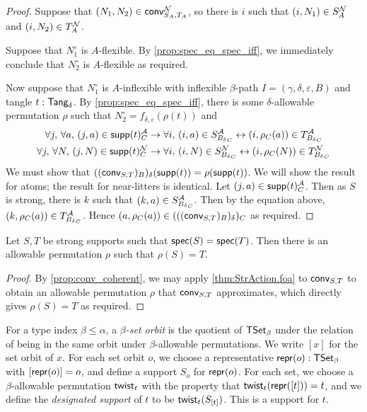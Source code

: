 \begin{proof}
  Suppose that \( (N_1, N_2) \in \operatorname{\mathsf{conv}}_{S_A,T_A}^{\mathcal N} \), so there is \( i \) such that \( (i, N_1) \in S_A^{\mathcal N} \) and \( (i, N_2) \in T_A^{\mathcal N} \).

  Suppose that \( N_1^\circ \) is \( A \)-flexible.
  By \cref{prop:spec_eq_spec_iff}, we immediately conclude that \( N_2^\circ \) is \( A \)-flexible as required.

  Now suppose that \( N_1^\circ \) is \( A \)-inflexible with inflexible \( \beta \)-path \( I = (\gamma,\delta,\varepsilon,B) \) and tangle \( t : \mathsf{Tang}_\delta \).
  By \cref{prop:spec_eq_spec_iff}, there is some \( \delta \)-allowable permutation \( \rho \) such that \( N_2^\circ = f_{\delta,\varepsilon}(\rho(t)) \) and
  \begin{align*}
    \forall j,\, \forall a,\, (j, a) \in \operatorname{\mathsf{supp}}(t)_C^{\mathcal A} &\to \forall i,\, (i, a) \in S_{{B_\delta}_C}^{\mathcal A} \leftrightarrow (i, \rho_C(a)) \in T_{{B_\delta}_C}^{\mathcal A} \\
    \forall j,\, \forall N,\, (j, N) \in \operatorname{\mathsf{supp}}(t)_C^{\mathcal N} &\to \forall i,\, (i, N) \in S_{{B_\delta}_C}^{\mathcal N} \leftrightarrow (i, \rho_C(N)) \in T_{{B_\delta}_C}^{\mathcal N}
  \end{align*}
  We must show that \( ((\operatorname{\mathsf{conv}}_{S,T})_B)_\delta(\operatorname{\mathsf{supp}}(t)) = \rho(\operatorname{\mathsf{supp}}(t)) \).
  We will show the result for atoms; the result for near-litters is identical.
  Let \( (j, a) \in \operatorname{\mathsf{supp}}(t)_C^{\mathcal A} \).
  Then as \( S \) is strong, there is \( k \) such that \( (k, a) \in S_{{B_\delta}_C}^{\mathcal A} \).
  Then by the equation above, \( (k, \rho_C(a)) \in T_{{B_\delta}_C}^{\mathcal A} \).
  Hence \( (a, \rho_C(a)) \in (((\operatorname{\mathsf{conv}}_{S,T})_B)_\delta)_C \) as required.
\end{proof}
\begin{proposition}
  Let \( S, T \) be strong supports such that \( \operatorname{\mathsf{spec}}(S) = \operatorname{\mathsf{spec}}(T) \).
  Then there is an allowable permutation \( \rho \) such that \( \rho(S) = T \).
\end{proposition}
\begin{proof}
  By \cref{prop:conv_coherent}, we may apply \cref{thm:StrAction.foa} to \( \operatorname{\mathsf{conv}}_{S,T} \) to obtain an allowable permutation \( \rho \) that \( \operatorname{\mathsf{conv}}_{S,T} \) approximates, which directly gives \( \rho(S) = T \) as required.
\end{proof}

\begin{definition}
  For a type index \( \beta \leq \alpha \), a \emph{\( \beta \)-set orbit} is the quotient of \( \mathsf{TSet}_\beta \) under the relation of being in the same orbit under \( \beta \)-allowable permutations.
  We write \( [x] \) for the set orbit of \( x \).
  For each set orbit \( o \), we choose a representative \( \operatorname{\mathsf{repr}}(o) : \mathsf{TSet}_\beta \) with \( [\operatorname{\mathsf{repr}}(o)] = o \), and define a support \( S_o \) for \( \operatorname{\mathsf{repr}}(o) \).
  For each set, we choose a \( \beta \)-allowable permutation \( \operatorname{\mathsf{twist}}_t \) with the property that \( \operatorname{\mathsf{twist}}_t(\operatorname{\mathsf{repr}}([t])) = t \), and we define the \emph{designated support} of \( t \) to be \( \operatorname{\mathsf{twist}}_t(S_{[t]}) \).
  This is a support for \( t \).
\end{definition}
